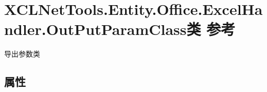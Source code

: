 \hypertarget{class_x_c_l_net_tools_1_1_entity_1_1_office_1_1_excel_handler_1_1_out_put_param_class}{\section{X\-C\-L\-Net\-Tools.\-Entity.\-Office.\-Excel\-Handler.\-Out\-Put\-Param\-Class类 参考}
\label{class_x_c_l_net_tools_1_1_entity_1_1_office_1_1_excel_handler_1_1_out_put_param_class}
}


导出参数类  


\subsection*{属性}
